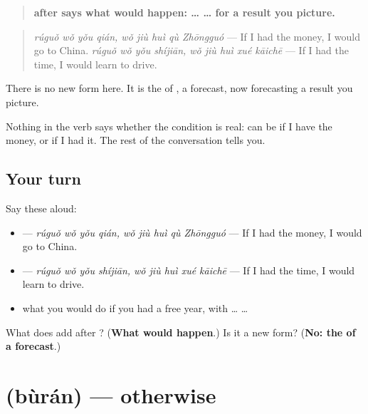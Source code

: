 \begin{grammarlens}[title={Grammar Lens: \zh{如果} … \zh{就会} …, a result you picture}]
\begin{quote}
\textbf{ after  says what would happen:  …  … for a result you picture.}
\end{quote}

\begin{quote}
\textbf{ } \emph{rúguǒ wǒ yǒu qián, wǒ jiù huì qù Zhōngguó} — If I had the money, I would go to China. \textbf{ } \emph{rúguǒ wǒ yǒu shíjiān, wǒ jiù huì xué kāichē} — If I had the time, I would learn to drive.
\end{quote}

There is no new form here. It is the  of , a forecast, now forecasting a result you picture.

Nothing in the verb says whether the condition is real:  can be if I have the money, or if I had it. The rest of the conversation tells you.
\end{grammarlens}

\subsection*{Your turn}
Say these aloud:

\begin{itemize}
\raggedright
  \item {}  — \emph{rúguǒ wǒ yǒu qián, wǒ jiù huì qù Zhōngguó} — If I had the money, I would go to China.
  \item {}  — \emph{rúguǒ wǒ yǒu shíjiān, wǒ jiù huì xué kāichē} — If I had the time, I would learn to drive.
  \item what you would do if you had a free year, with  …  …
\end{itemize}

\begin{tcolorbox}[breakable,colback=teal!4,colframe=teal!35!black,title={Before you move on}]
What does  add after ? (\textbf{What would happen}.) Is it a new form? (\textbf{No: the  of a forecast}.)
\end{tcolorbox}
\section[\texorpdfstring{\zh{不然} (bùrán)}{不然 (bùrán)}]{ (bùrán) — otherwise}

